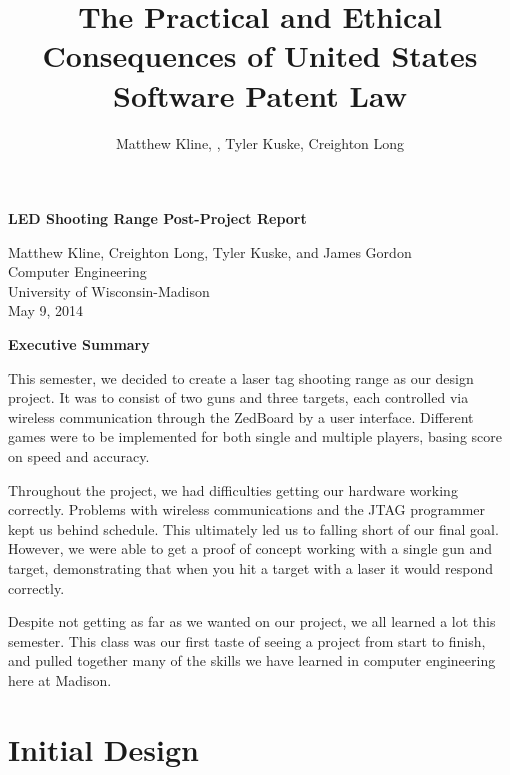 \documentclass[oneside]{book}
\begin{document}
\title{The Practical and Ethical Consequences of United States Software Patent Law}
\author{Matthew Kline, , Tyler Kuske, Creighton Long}
\begin{titlepage}
\vspace*{\fill}
\begin{Large}
\begin{center}
\textbf{LED Shooting Range Post-Project Report}

Matthew Kline, Creighton Long, Tyler Kuske, and James Gordon \\
Computer Engineering \\
University of Wisconsin-Madison \\
May 9, 2014
\end{center}
\end{Large}
\vspace*{\fill}
\end{titlepage}
\frontmatter
\begin{Large}
\begin{center}
\textbf{Executive Summary}
\end{center}
\end{Large}

This semester, we decided to create a laser tag shooting range as our design project.
It was to consist of two guns and three targets,
each controlled via wireless communication through the ZedBoard by a user interface.
Different games were to be implemented for both single and multiple players,
basing score on speed and accuracy.

Throughout the project, we had difficulties getting our hardware working correctly.
Problems with wireless communications and the JTAG programmer kept us behind schedule.
This ultimately led us to falling short of our final goal.
However, we were able to get a proof of concept working with a single gun and target,
demonstrating that when you hit a target with a laser it would respond correctly.

Despite not getting as far as we wanted on our project, we all learned a lot this semester.
This class was our first taste of seeing a project from start to finish,
and pulled together many of the skills we have learned in computer engineering here
at Madison.

\newpage
\tableofcontents
\newpage
{}
\mainmatter

\section{Initial Design}
\end{document}

